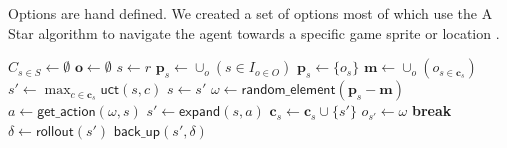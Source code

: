 Options are hand defined. We created a set of options most of which use the A
Star algorithm to navigate the agent towards a specific game sprite or location
\cite{hart1968formal}.

\begin{algorithm}
	\caption{$\mathsf{O-MCTS}(O, r, t, d)$}
	\label{alg:omcts}
	\begin{algorithmic}[1]
		\State $C_{s \in S} \gets \emptyset$ 
		\State $\mathbf{o} \gets \emptyset$ 
		 \label{alg:omcts:mainloop}
			\State $s \gets r$ 
			 \label{alg:omcts:innerloop}
				 \label{alg:omcts:sp} 
					\State $\mathbf{p}_s \gets \cup_o (s \in I_{o \in O})$ 
				\Else
					\State $\mathbf{p}_s \gets \{o_s\}$ 
				\EndIf \label{alg:omcts:ep}
				\State $\mathbf{m} \gets \cup_o (o_{s \in \mathbf{c}_s})$ 
				 
					\State $s' \gets \max_{c \in \mathbf{c}_s} \mathsf{uct}(s, c)$ \label{alg:omcts:uct} 
					\State $s \gets s'$ \label{alg:omcts:ss} 
				\Else \label{alg:omcts:sexpand}
					\State $\omega \gets \mathsf{random\_element}(\mathbf{p}_s - \mathbf{m})$ 
					\State $a \gets \mathsf{get\_action}(\omega, s)$ 
					\State $s' \gets \mathsf{expand}(s, a)$ 
						\State $\mathbf{c}_s \gets \mathbf{c}_s \cup \{s'\}$ 
					\State $o_{s'} \gets \omega$
					\State \textbf{break} \label{alg:omcts:break}
				\EndIf \label{alg:omcts:eexpand}
			\EndWhile
			\State $\delta \gets \mathsf{rollout}(s')$ \label{alg:omcts:rollout}
			\State $\mathsf{back\_up}(s', \delta)$ \label{alg:omcts:backup}
		\EndWhile
		\State {}
	\end{algorithmic}
\end{algorithm}
